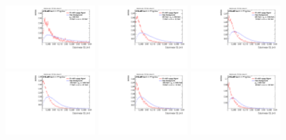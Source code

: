 \begin{figure}
\includegraphics[width=0.3\textwidth]{sascha_input/Appendix/Distributions/w/distributions/beta3/h_recoJet_C2_3_bin1.pdf} \hspace{1mm}
\includegraphics[width=0.3\textwidth]{sascha_input/Appendix/Distributions/w/distributions/beta3/h_recoJet_C2_3_bin2.pdf} \hspace{1mm}
\includegraphics[width=0.3\textwidth]{sascha_input/Appendix/Distributions/w/distributions/beta3/h_recoJet_C2_3_bin3.pdf} 
\bigskip
\includegraphics[width=0.3\textwidth]{sascha_input/Appendix/Distributions/w/distributions/beta3/h_recoJet_C2_3_bin4.pdf} \hspace{1mm}
\includegraphics[width=0.3\textwidth]{sascha_input/Appendix/Distributions/w/distributions/beta3/h_recoJet_C2_3_bin5.pdf} \hspace{1mm}
\includegraphics[width=0.3\textwidth]{sascha_input/Appendix/Distributions/w/distributions/beta3/h_recoJet_C2_3_bin6.pdf}

\end{figure}
